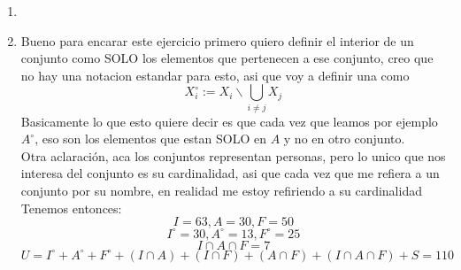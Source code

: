 \begin{enumerate}[label=\alph*)]
    \item \hacer
    
    \item Bueno para encarar este ejercicio primero quiero definir
    el interior de un conjunto como SOLO los elementos que pertenecen a ese conjunto,
    creo que no hay una notacion estandar para esto, asi que voy a definir una como
    {\large
    \[
    X_i^\circ := X_i \backslash \bigcup_{i \ne j} X_j
    \]
    }
    Basicamente lo que esto quiere decir es que cada vez que leamos
    por ejemplo $A^\circ$, eso son los elementos que estan SOLO en $A$ y no
    en otro conjunto. \\
    Otra aclaración, aca los conjuntos representan personas, pero lo unico
    que nos interesa del conjunto es su cardinalidad, asi que cada vez
    que me refiera a un conjunto por su nombre, en realidad me estoy refiriendo a su cardinalidad
    Tenemos entonces:
    \[I = 63, A = 30, F = 50\]
    \[I^\circ = 30, A^\circ = 13, F^\circ = 25\]
    \[I\cap A\cap F = 7\]
    \[U = I^\circ + A^\circ + F^\circ + (I \cap A)+ (I \cap F) + (A \cap F) + (I \cap A \cap F) + S = 110\]


\end{enumerate}
